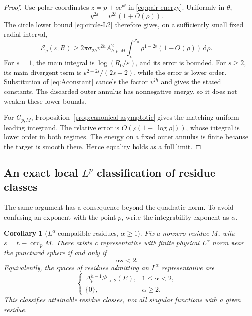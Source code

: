 \documentclass[11pt,a4paper]{article}
\numberwithin{equation}{section}
\newtheorem{corollary}[theorem]{Corollary}
\theoremstyle{definition}
\theoremstyle{remark}
\newcommand{\ii}{\mathrm i}
\newcommand{\PPl}[1]{\mathscr P_{<#1}(E)}
\newcommand{\ord}{\operatorname{ord}}
\newcommand{\dd}{\,\mathrm d}
\newcommand{\sig}{\sigma_{2h}}
\begin{document}
\begin{proof}
Use polar coordinates $z=p+\rho e^{\ii\theta}$ in
\eqref{eq:pair-energy}. Uniformly in $\theta$,
\[
 y^{2h}=v^{2h}(1+O(\rho)).
\]
The circle lower bound \eqref{eq:circle-L2} therefore gives, on a sufficiently
small fixed radial interval,
\[
 \mathcal E_g(\varepsilon,R)
 \ge2\pi\sig v^{2h} A_{h,p,M}^2
 \int_\varepsilon^{R_0}\rho^{1-2s}(1-O(\rho))\dd\rho.
\]
For $s=1$, the main integral is $\log(R_0/\varepsilon)$, and its error is
bounded. For $s\ge2$, its main divergent term is
$\varepsilon^{2-2s}/(2s-2)$, while the error is lower order. Substitution of
\eqref{eq:Aconstant} cancels the factor $v^{2h}$ and gives the stated
constants. The discarded outer annulus has nonnegative energy, so it does
not weaken these lower bounds.

For $G_{p,M}$, Proposition~\ref{prop:canonical-asymptotic} gives the matching
uniform leading integrand. The relative error is
$O(\rho(1+|\log\rho|))$, whose integral is lower order in both regimes.
The energy on a fixed outer annulus is finite because the target is smooth
there. Hence equality holds as a full limit.
\end{proof}

\subsection{An exact local \texorpdfstring{$L^p$}{Lp} classification of residue classes}

The same argument has a consequence beyond the quadratic norm. To avoid
confusing an exponent with the point $p$, write the integrability exponent
as $\alpha$.

\begin{corollary}[$L^\alpha$-compatible residues, $\alpha\ge1$]
\label{cor:Lp}
Fix a nonzero residue $M$, with $s=h-\ord_pM$. There exists a representative
with finite physical $L^\alpha$ norm near the punctured sphere if and only if
\begin{equation}\label{eq:Lp-threshold}
 \alpha s<2.
\end{equation}
Equivalently, the spaces of residues admitting an $L^\alpha$ representative
are
\begin{equation}\label{eq:Lp-spaces}
 \begin{cases}
  \Delta_p^{h-1}\PPl{2},&1\le\alpha<2,\\
  \{0\},&\alpha\ge2.
 \end{cases}
\end{equation}
This classifies attainable residue classes, not all singular functions with
a given residue.
\end{corollary}
\end{document}
